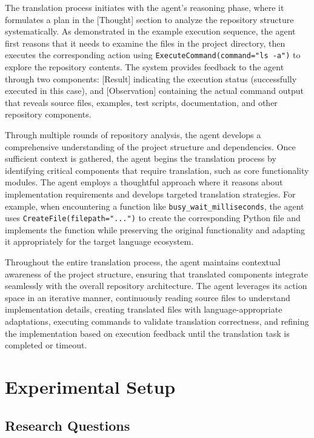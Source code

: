 The translation process initiates with the agent's reasoning phase, where it formulates a plan in the [Thought] section to analyze the repository structure systematically. As demonstrated in the example execution sequence, the agent first reasons that it needs to examine the files in the project directory, then executes the corresponding action using \texttt{ExecuteCommand(command="ls -a")} to explore the repository contents. The system provides feedback to the agent through two components: [Result] indicating the execution status (successfully executed in this case), and [Observation] containing the actual command output that reveals source files, examples, test scripts, documentation, and other repository components.

Through multiple rounds of repository analysis, the agent develops a comprehensive understanding of the project structure and dependencies. Once sufficient context is gathered, the agent begins the translation process by identifying critical components that require translation, such as core functionality modules. The agent employs a thoughtful approach where it reasons about implementation requirements and develops targeted translation strategies. For example, when encountering a function like \texttt{busy\_wait\_milliseconds}, the agent uses \texttt{CreateFile(filepath="...")} to create the corresponding Python file and implements the function while preserving the original functionality and adapting it appropriately for the target language ecosystem.

Throughout the entire translation process, the agent maintains contextual awareness of the project structure, ensuring that translated components integrate seamlessly with the overall repository architecture. The agent leverages its action space in an iterative manner, continuously reading source files to understand implementation details, creating translated files with language-appropriate adaptations, executing commands to validate translation correctness, and refining the implementation based on execution feedback until the translation task is completed or timeout.



\section{Experimental Setup}

\subsection{Research Questions}

